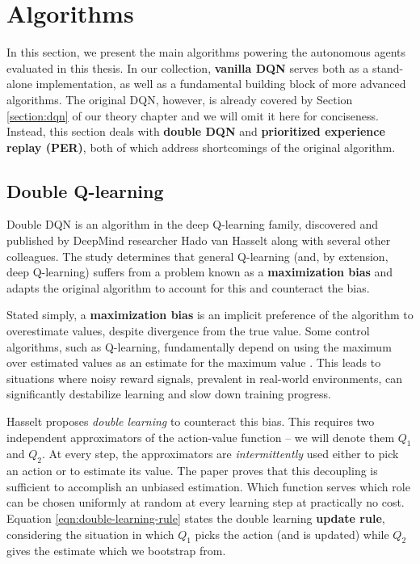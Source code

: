 \section{Algorithms} \label{section:approach-algorithms}
In this section, we present the main algorithms powering the autonomous agents evaluated in this thesis. In our collection, \textbf{vanilla DQN} serves both as a stand-alone implementation, as well as a fundamental building block of more advanced algorithms.
The original DQN, however, is already covered by Section \ref{section:dqn} of our theory chapter and we will omit it here for conciseness.
Instead, this section deals with \textbf{double DQN} and \textbf{prioritized experience replay (PER)}, both of which address shortcomings of the original algorithm.

\subsection{Double Q-learning} \label{section:double-dqn}
Double DQN \cite{ddqn-paper} is an algorithm in the deep Q-learning family, discovered and published by DeepMind researcher Hado van Hasselt along with several other colleagues.
The study determines that general Q-learning (and, by extension, deep Q-learning) suffers from a problem known as a \textbf{maximization bias} and adapts the original algorithm to account for this and counteract the bias.

Stated simply, a \textbf{maximization bias} is an implicit preference of the algorithm to overestimate values, despite divergence from the true value.
Some control algorithms, such as Q-learning, fundamentally depend on using the maximum over estimated values as an estimate for the maximum value \cite{rlai}.
This leads to situations where noisy reward signals, prevalent in real-world environments, can significantly destabilize learning and slow down training progress.

Hasselt proposes \emph{double learning} to counteract this bias.
This requires two independent approximators of the action-value function -- we will denote them $Q_1$ and $Q_2$.
At every step, the approximators are \emph{intermittently} used either to pick an action or to estimate its value.
The paper proves that this decoupling is sufficient to accomplish an unbiased estimation.
Which function serves which role can be chosen uniformly at random at every learning step at practically no cost.
Equation \ref{eqn:double-learning-rule} states the double learning \textbf{update rule}, considering the situation in which $Q_1$ picks the action (and is updated) while $Q_2$ gives the estimate which we bootstrap from.

